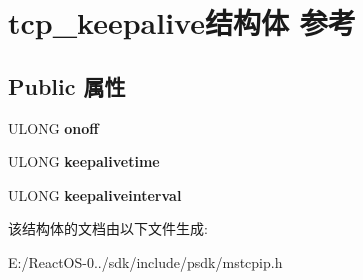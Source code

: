 \hypertarget{structtcp__keepalive}{}\section{tcp\+\_\+keepalive结构体 参考}
\label{structtcp__keepalive}
\subsection*{Public 属性}
\begin{DoxyCompactItemize}
\item 
\mbox{\label{structtcp__keepalive_a9ae611f53de4b2f6dd300228159b10fe}} 
U\+L\+O\+NG {\bfseries onoff}
\item 
\mbox{\label{structtcp__keepalive_a2e944977290b1ec162deace07b13786c}} 
U\+L\+O\+NG {\bfseries keepalivetime}
\item 
\mbox{\label{structtcp__keepalive_aaac6c923947c78f358619533148a1719}} 
U\+L\+O\+NG {\bfseries keepaliveinterval}
\end{DoxyCompactItemize}


该结构体的文档由以下文件生成\+:\begin{DoxyCompactItemize}
\item 
E\+:/\+React\+O\+S-\/0../sdk/include/psdk/mstcpip.\+h\end{DoxyCompactItemize}
